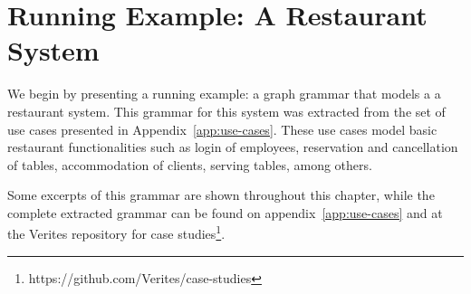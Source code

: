 \section{Running Example: A Restaurant System}

We begin by presenting a running example: a graph grammar that models a a restaurant system. This grammar for this system was extracted from the set of use cases presented in Appendix~\ref{app:use-cases}. These use cases model basic restaurant functionalities such as login of employees, reservation and cancellation of tables, accommodation of clients, serving tables, among others.

Some excerpts of this grammar are shown throughout this chapter, while the complete extracted grammar can be found on appendix~\ref{app:use-cases} and at the Verites repository for case studies\footnote{https://github.com/Verites/case-studies}.


